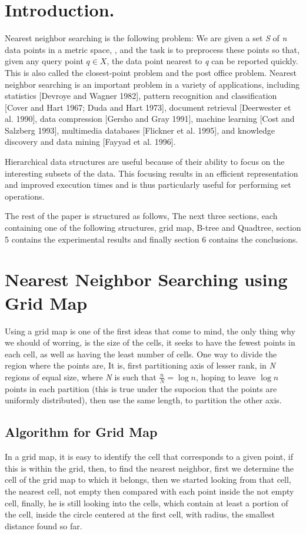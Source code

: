 \documentclass[ijoc,nonblindrev]{informs3} %
\begin{document}
\section{Introduction.}
Nearest neighbor searching is the following problem: 
We are given a set \textit{S} of \textit{n} data points in a metric space, ,
and the task is to preprocess these points so that,
given any query point $q \in X$,
the data point nearest to \textit{q} can be reported quickly.
This is also called the closest-point problem and the post office problem.
Nearest neighbor searching is an important problem in a variety of applications, 
including 
statistics [Devroye and Wagner 1982],
pattern recognition and classification [Cover and Hart 1967; Duda and Hart 1973],
document retrieval [Deerwester et al. 1990],
data compression [Gersho and Gray 1991],
machine learning [Cost and Salzberg 1993],
multimedia databases [Flickner et al. 1995],
and knowledge discovery and data mining [Fayyad et al. 1996].

Hierarchical data structures are useful because of their ability to focus on the
interesting subsets of the data. 
This focusing results in an efficient representation and improved execution times and is thus
particularly useful for performing set operations.

The rest of the paper is structured as follows,
The next three sections, 
each containing one of the following structures,
grid map, B-tree and Quadtree,
section 5 contains the experimental results
and finally section 6 contains the conclusions.

\section{Nearest Neighbor Searching using Grid Map}
Using a grid map is one of the first ideas that come to mind,
the only thing why we should of worring, is the size of the cells,
it seeks to have the fewest points in each cell,
as well as having the least number of cells.
One way to divide the region where the points are,
It is, first partitioning axis of lesser rank, in \textit{N} regions of equal size,
where \textit{N} is such that $\frac{n}{N} = \log{n}$,
hoping to leave $\log{n}$ points in each partition
(this is true under the supocion that the points are uniformly distributed),
then use the same length, to partition the other axis.

\subsection{Algorithm for Grid Map}
In a grid map, it is easy to identify the cell that corresponds to a given point,
if this is within the grid,
then, to find the nearest neighbor,
first we determine the cell of the grid map to which it belongs,
then we started looking from that cell, the nearest cell, not empty
then compared with each point inside the not empty cell,
finally, he is still looking into the cells,
which contain at least a portion of the cell,
inside the circle centered at the first cell,
with radius, the smallest distance found so far.
\end{document}
